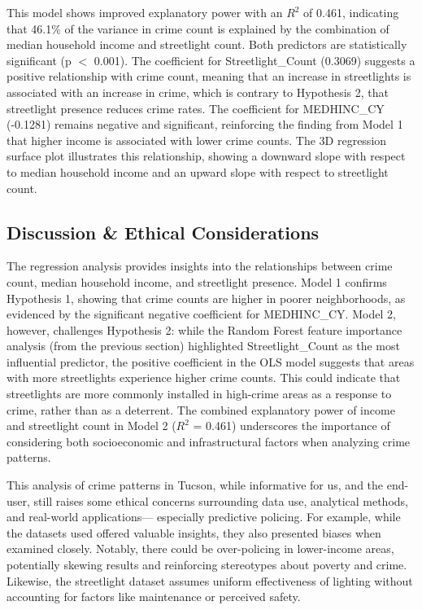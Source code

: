 \documentclass{report}
\begin{document}
\par This model shows improved explanatory power with an $R^2$ of 0.461, indicating that 46.1\% of the variance in crime count is explained by the combination of median household income and streetlight count. Both predictors are statistically significant (p $<$ 0.001). The coefficient for Streetlight\_Count (0.3069) suggests a positive relationship with crime count, meaning that an increase in streetlights is associated with an increase in crime, which is contrary to Hypothesis 2,
that streetlight presence reduces crime rates. The coefficient for MEDHINC\_CY (-0.1281) remains negative and significant, reinforcing the finding from Model 1 that higher income is associated with lower crime counts. The 3D regression surface plot illustrates this relationship, showing a downward slope with respect to median household income and an upward slope with respect to streetlight count.

\subsection{Discussion \& Ethical Considerations}
\par The regression analysis provides insights into the relationships between crime count, median household income, and streetlight presence. Model 1 confirms Hypothesis 1, showing that crime counts are higher in poorer neighborhoods, as evidenced by the significant negative coefficient for MEDHINC\_CY. Model 2, however, challenges Hypothesis 2: while the Random Forest feature importance analysis (from the previous section) highlighted Streetlight\_Count as the most influential predictor, the positive coefficient in the OLS model suggests that areas with more streetlights experience higher crime counts. This could indicate that streetlights are more commonly installed in high-crime areas as a response to crime, rather than as a deterrent. The combined explanatory power of income and streetlight count in Model 2 ($R^2$ = 0.461) underscores the importance of considering both socioeconomic and infrastructural factors when analyzing crime patterns.

\par This analysis of crime patterns in Tucson, while informative for us, and the end-user, still raises some ethical concerns surrounding data use, analytical methods, and real-world applications— especially predictive policing. For example, while the datasets used offered valuable insights, they also presented biases when examined closely. Notably, there could be over-policing in lower-income areas, potentially skewing results and reinforcing stereotypes about poverty and crime. Likewise, the streetlight dataset assumes uniform effectiveness of lighting without accounting for factors like maintenance or perceived safety.
\end{document}
